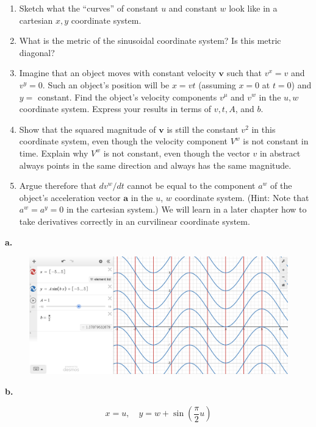 \documentclass[12pt]{article}
\begin{document}
\begin{enumerate}
      \item Sketch what the ``curves'' of constant \(u\) and constant \(w\) look like in a cartesian \(x, y\) coordinate system.
      \item What is the metric of the sinusoidal coordinate system? Is this metric diagonal?
      \item Imagine that an object moves with constant velocity \(\boldsymbol{v}\) such that \(v^x=v\) and \(v^y=0\). Such an object's position will be \(x=v t\) (assuming \(x=0\) at \(t=0\)) and \(y=\) constant. Find the object's velocity components \(v^\mu \) and \(v^w\) in the \(u, w\) coordinate system. Express your results in terms of \(v, t, A\), and \(b\).
      \item Show that the squared magnitude of \(\boldsymbol{v}\) is still the constant \(v^2\) in this coordinate system, even though the velocity component \(V^w\) is not constant in time. Explain why \(V^w\) is not constant, even though the vector \(v\) in abstract always points in the same direction and always has the same magnitude.
      \item Argue therefore that \(d v^w / d t\) cannot be equal to the component \(a^w\) of the object's acceleration vector \(\boldsymbol{a}\) in the \(u\), \(w\) coordinate system. (Hint: Note that \(a^w=a^y=0\) in the cartesian system.) We will learn in a later chapter how to take derivatives correctly in an curvilinear coordinate system.
\end{enumerate}

\textbf{a.}

\begin{figure}[H]
      \centering
      \includegraphics[scale=0.15]{Q2.png}
\end{figure}

\textbf{b.}

\[
      x = u,\quad y = w + \sin(\frac{\pi}{2} u)
\]
\end{document}
